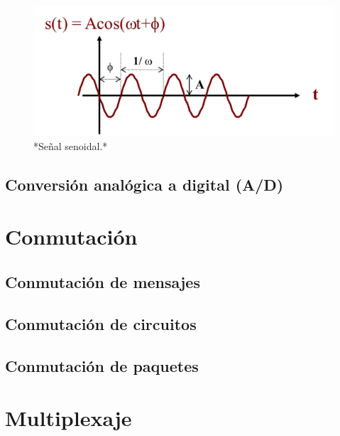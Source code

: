 \documentclass[
]{book}
\begin{document}
\begin{figure}

{\centering \includegraphics{figuras/c1/senoidal-1} 

}

\caption{*Señal senoidal.*}\label{fig:senoidal}
\end{figure}

\hypertarget{conversiuxf3n-analuxf3gica-a-digital-ad}{%
\subsection{Conversión analógica a digital (A/D)}\label{conversiuxf3n-analuxf3gica-a-digital-ad}}

\hypertarget{conmutaciuxf3n}{%
\section{Conmutación}\label{conmutaciuxf3n}}

\hypertarget{conmutaciuxf3n-de-mensajes}{%
\subsection{Conmutación de mensajes}\label{conmutaciuxf3n-de-mensajes}}

\hypertarget{conmutaciuxf3n-de-circuitos}{%
\subsection{Conmutación de circuitos}\label{conmutaciuxf3n-de-circuitos}}

\hypertarget{conmutaciuxf3n-de-paquetes}{%
\subsection{Conmutación de paquetes}\label{conmutaciuxf3n-de-paquetes}}

\hypertarget{multiplexaje}{%
\section{Multiplexaje}\label{multiplexaje}}
\end{document}
